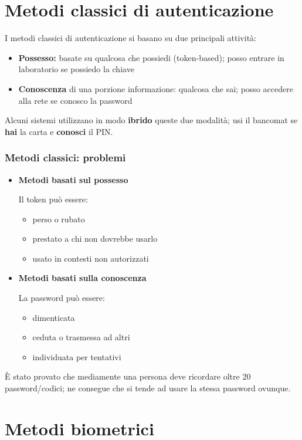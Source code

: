 \documentclass{report}
\begin{document}
\section{Metodi classici di autenticazione}
I metodi classici di autenticazione si basano su due principali attività:
\begin{itemize}
    \item \textbf{Possesso:} basate su qualcosa che possiedi (token-based); posso entrare in laboratorio se possiedo la chiave
    \item \textbf{Conoscenza} di una porzione informazione: qualcosa che sai; posso accedere alla rete se conosco la password
\end{itemize}
Alcuni sistemi utilizzano in modo \textbf{ibrido} queste due modalità; usi il bancomat se \textbf{hai} la carta e \textbf{conosci} il PIN.

\subsubsection{Metodi classici: problemi}

\begin{itemize}
    \item  \textbf{Metodi basati sul possesso}
    
    Il token può essere:
    \begin{itemize}
        \item perso o rubato
        \item prestato a chi non dovrebbe usarlo
        \item usato in contesti non autorizzati
    \end{itemize}
    \item \textbf{Metodi basati sulla conoscenza}
    
    La password può essere:
    \begin{itemize}
        \item dimenticata
        \item ceduta o trasmessa ad altri
        \item individuata per tentativi
    \end{itemize}
\end{itemize}

\noindent È stato provato che mediamente una persona deve ricordare oltre 20 password/codici; ne consegue che si tende ad usare la stessa password ovunque.

\section{Metodi biometrici}
\end{document}
